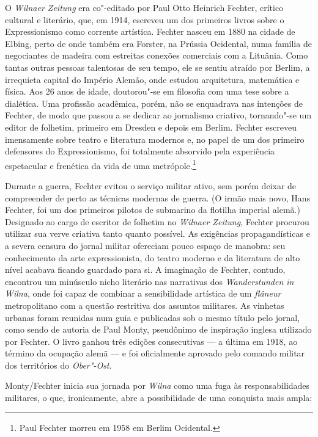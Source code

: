O \textit{Wilnaer Zeitung} era co"-editado por Paul Otto Heinrich Fechter,
crítico cultural e literário, que, em 1914, escreveu um dos primeiros
livros sobre o Expressionismo como corrente artística. Fechter nasceu em
1880 na cidade de Elbing, perto de onde também era Forster, na Prússia
Ocidental, numa família de negociantes de madeira com estreitas conexões
comerciais com a Lituânia. Como tantas outras pessoas talentosas de seu
tempo, ele se sentiu atraído por Berlim, a irrequieta capital do Império
Alemão, onde estudou arquitetura, matemática e física. Aos 26 anos de
idade, doutorou"-se em filosofia com uma tese sobre a dialética. Uma
profissão acadêmica, porém, não se enquadrava nas intenções de Fechter,
de modo que passou a se dedicar ao jornalismo criativo, tornando"-se um
editor de folhetim, primeiro em Dresden e depois em Berlim. Fechter
escreveu imensamente sobre teatro e literatura modernos e, no papel de
um dos primeiro defensores do Expressionismo, foi totalmente absorvido
pela experiência espetacular e frenética da vida de uma
metrópole.\footnote{Paul Fechter morreu em 1958 em Berlim Ocidental.}

Durante a guerra, Fechter evitou o serviço militar ativo, sem porém
deixar de compreender de perto as técnicas modernas de guerra. (O irmão
mais novo, Hans Fechter, foi um dos primeiros pilotos de submarino da
flotilha imperial alemã.) Designado ao cargo de escritor de folhetim no
\textit{Wilnaer Zeitung}, Fechter procurou utilizar sua verve criativa
tanto quanto possível. As exigências propagandísticas e a severa censura
do jornal militar ofereciam pouco espaço de manobra: seu conhecimento da
arte expressionista, do teatro moderno e da literatura de alto nível
acabava ficando guardado para si. A imaginação de Fechter, contudo,
encontrou um minúsculo nicho literário nas narrativas dos
\textit{Wanderstunden in Wilna}, onde foi capaz de combinar a sensibilidade
artística de um \textit{flâneur} metropolitano com a questão restritiva
dos assuntos militares. As vinhetas urbanas foram reunidas num guia e
publicadas sob o mesmo título pelo jornal, como sendo de autoria de Paul
Monty, pseudônimo de inspiração inglesa utilizado por Fechter. O livro
ganhou três edições consecutivas --- a última em 1918, ao término da
ocupação alemã --- e foi oficialmente aprovado pelo comando militar dos
territórios do \textit{Ober"-Ost}.

Monty/Fechter inicia sua jornada por \textit{Wilna} como uma fuga às
responsabilidades militares, o que, ironicamente, abre a possibilidade
de uma conquista mais ampla:

